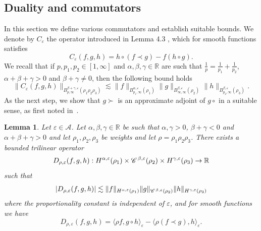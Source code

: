 \documentclass[a4paper,11pt]{article}
\newtheorem{lemma}[theorem]{Lemma}
\numberwithin{equation}{section}
\newcommand{\CC}{\mathscr{C} \hspace{.1em}}
\begin{document}
  
  \subsection{Duality and commutators}
  \label{s:l2}
  
In this section we define various commutators and establish suitable bounds.  We denote by $C_{\varepsilon}$  the operator introduced in
Lemma 4.3 {\cite{MP17}}, which for smooth functions satisfies
\begin{equation}\label{eq:ce}
 C_{\varepsilon} (f, g, h) = h \circ (f \prec g) - f (h \circ g) .
 \end{equation}
We recall that if $p, p_1, p_2 \in [1, \infty]$ and $\alpha, \beta, \gamma \in
\mathbb{R}$ are such that $\frac{1}{p} = \frac{1}{p_1} + \frac{1}{p_2}$,
$\alpha + \beta + \gamma > 0$ and $\beta + \gamma \neq 0$, then the following
bound holds
\begin{equation}
  \| C_{\varepsilon} (f, g, h) \|_{B^{\beta + \gamma, \varepsilon}_{p, \infty}
  (\rho_1 \rho_2 \rho_3)} \lesssim \| f \|_{B^{\alpha, \varepsilon}_{p_1,
  \infty} (\rho_1)} \| g \|_{B_{\infty, \infty}^{\beta, \varepsilon}
  (\rho_2)_{}} \| h \|_{B_{p_2, \infty}^{\beta, \varepsilon} (\rho_3)_{}} .
  \label{eq:comm}
\end{equation}
As the next step, we show that $g \succ$ is an approximate adjoint of $g
\circ$ in a suitable sense, as first noted in~\cite{gubinelli_semilinear_2018}.
  
  \begin{lemma}
  \label{lem:dual1}Let $\varepsilon \in \mathcal{A}$. Let $\alpha, \beta,
  \gamma \in \mathbb{R}$ be such that $\alpha, \gamma > 0$, $\beta + \gamma <
  0$ and $\alpha + \beta + \gamma > 0$ and let $\rho_1, \rho_2, \rho_3$ be
  weights and let $\rho = \rho_1 \rho_2 \rho_3$. There exists a bounded
  trilinear operator
  \[ D_{\rho, \varepsilon} (f, g, h) : H^{\alpha, \varepsilon} (\rho_1) \times
     \CC^{\beta, \varepsilon} (\rho_2) \times H^{\gamma, \varepsilon} (\rho_3)
     \rightarrow \mathbb{R} \]
  such that
  \[ | D_{\rho, \varepsilon} (f, g, h) | \lesssim \| f \|_{H^{\alpha,
     \varepsilon} (\rho_1)} \| g \|_{\CC^{\beta, \varepsilon} (\rho_2)} \| h
     \|_{H^{\gamma, \varepsilon} (\rho_3)} \]
  where the proportionality constant is independent of $\varepsilon$, and for
  smooth functions we have
  \[ D_{\rho, \varepsilon} (f, g, h) = \langle \rho f, g \circ h
     \rangle_{\varepsilon} - \langle \rho (f \prec g), h \rangle_{\varepsilon}
     . \]
\end{lemma}
\end{document}
